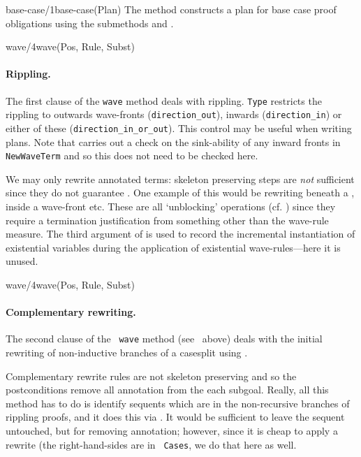 \begin{method}{base-case/1}{base-case(Plan)}%
The  method constructs a plan for base
case proof obligations using the submethods 
 and . 
{\tiny
}
\end{method}

\begin{method}{wave/4}{wave(Pos, Rule, Subst)}%
\paragraph {Rippling.}  The first clause of the {\tt wave}
method deals with rippling. {\tt Type}
restricts the rippling to outwards wave-fronts
(\verb"direction_out"), inwards
(\verb"direction_in") or either of these (\verb"direction_in_or_out").
This control may be useful when writing plans.  Note that 
carries out a check on the sink-ability of any inward fronts in {\tt
NewWaveTerm} and so this does not need to be checked here.

We may only rewrite annotated terms: skeleton
preserving steps are {\em not\/}
sufficient since they do not guarantee .  One
example of this would be rewriting beneath a , inside a
wave-front etc.  These are all `unblocking' operations (cf.\@
{}) since they require a termination justification from
something other than the wave-rule measure.
{\tiny
}
The third argument of  is used to record the incremental
instantiation of existential variables during the application of
existential wave-rules---here it is unused. 

\end{method}

\begin{method}{wave/4}{wave(Pos, Rule, Subst)}%
\paragraph {Complementary rewriting.} The second clause of the {\tt
wave} method (see~ above) deals with the initial rewriting
of non-inductive branches of a casesplit using {\em {}}.

 Complementary rewrite rules are not skeleton preserving and so the
   postconditions remove all annotation from the each subgoal.
   Really, all this method has to do is identify sequents which are in
   the non-recursive branches of rippling proofs, and it does this via
   .  It would be sufficient to leave the
   sequent untouched, but for removing annotation; however, since it
   is cheap to apply a rewrite (the right-hand-sides are in {\tt
   Cases}, we do that here as well.
\end{method}

